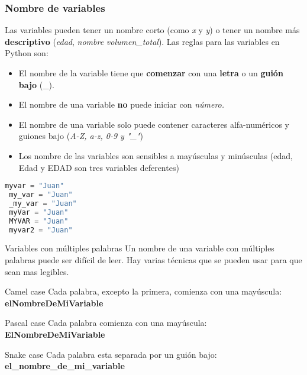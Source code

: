 \begin{frame}[fragile,b]
  \frametitle{Nombre de variables}

  \vspace{\baselineskip}
  Las variables pueden tener un nombre corto (como \textit{x} y \textit{y})
  o tener un nombre más \textbf{descriptivo} (\textit{edad}, \textit{nombre} 
  \textit{volumen\_total}). Las reglas para las variables en Python son:
  \pausa

  \begin{itemize}
    \item El nombre de la variable tiene que \textbf{comenzar} con una
      \textbf{letra} o un \textbf{guión bajo} (\_).
    \pausa
    \item El nombre de una variable \textbf{no} puede iniciar con
      \textit{número.}
    \pausa
    \item El nombre de una variable solo puede contener caracteres
      alfa-numéricos y guiones bajo (\textit{A-Z, a-z, 0-9 y "\_"})
    \pausa
    \item Los nombre de las variables son sensibles a mayúsculas y minúsculas
      (edad, Edad y EDAD son tres variables deferentes)
  \end{itemize}
  \pausa

  \begin{lstlisting}[language=Python]
 myvar = "Juan"
 my_var = "Juan"
 _my_var = "Juan"
 myVar = "Juan"
 MYVAR = "Juan"
 myvar2 = "Juan"
  \end{lstlisting}
\end{frame}

\begin{frame}[c]{Variables con múltiples palabras}
  Un nombre de una variable con múltiples palabras puede ser difícil de leer.
  Hay varias técnicas que se pueden usar para que sean mas legibles.
  \pausa
  \begin{block}{Camel case}
    Cada palabra, excepto la primera, comienza con una mayúscula:
    \textbf{elNombreDeMiVariable}
  \end{block}
  \pausa
  \begin{block}{Pascal case}
    Cada palabra comienza con una mayúscula:
    \textbf{ElNombreDeMiVariable}
  \end{block}
  \pausa
  \begin{exampleblock}{Snake case}
    Cada palabra esta separada por un guión bajo:
    \textbf{el\_nombre\_de\_mi\_variable}
  \end{exampleblock}
\end{frame}

